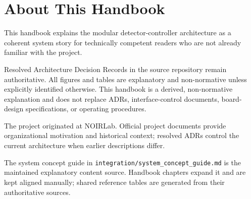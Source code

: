 \chapter*{About This Handbook}

This handbook explains the modular detector-controller architecture as a coherent system story for technically competent readers who are not already familiar with the project.

Resolved Architecture Decision Records in the source repository remain authoritative. All figures and tables are explanatory and non-normative unless explicitly identified otherwise. This handbook is a derived, non-normative explanation and does not replace ADRs, interface-control documents, board-design specifications, or operating procedures.

The project originated at NOIRLab. Official project documents provide organizational motivation and historical context; resolved ADRs control the current architecture when earlier descriptions differ.

The system concept guide in \texttt{integration/system\_concept\_guide.md} is the maintained explanatory content source. Handbook chapters expand it and are kept aligned manually; shared reference tables are generated from their authoritative sources.
